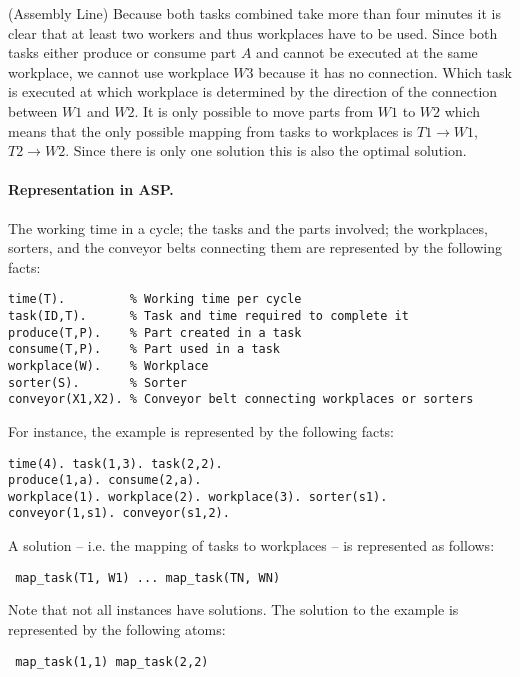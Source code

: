 \documentclass[a4paper,12pt]{article}
\begin{document}
\begin{PraktikumsAufgabe}{2}{(Assembly Line)}
Because both tasks combined take more than four minutes it is clear that at least two workers and thus workplaces have to be used.
Since both tasks either produce or consume part $A$ and cannot be executed at the same workplace,
we cannot use workplace $W3$ because it has no connection.
Which task is executed at which workplace is determined by the direction of the connection between $W1$ and $W2$.
It is only possible to move parts from $W1$ to $W2$ which means that the only possible mapping from tasks to workplaces is
$T1 \rightarrow W1$, $T2 \rightarrow W2$. Since there is only one solution this is also the optimal solution.

\paragraph{Representation in ASP.}
The working time in a cycle;
the tasks and the parts involved;
the workplaces, sorters, and the conveyor belts connecting them
are represented by the following facts:

\vspace{-1.5mm}
\begin{verbatim}
time(T).         % Working time per cycle
task(ID,T).      % Task and time required to complete it
produce(T,P).    % Part created in a task
consume(T,P).    % Part used in a task
workplace(W).    % Workplace
sorter(S).       % Sorter
conveyor(X1,X2). % Conveyor belt connecting workplaces or sorters
\end{verbatim}
\vspace{-1mm}
For instance, the example
is represented by the following facts:%
\vspace{-1.5mm}
\begin{verbatim}
time(4). task(1,3). task(2,2).
produce(1,a). consume(2,a).
workplace(1). workplace(2). workplace(3). sorter(s1).
conveyor(1,s1). conveyor(s1,2).
\end{verbatim}
\vspace{-1mm}
A solution -- i.e. the mapping of tasks to workplaces -- is represented as follows:
\vspace{-1.5mm}
\begin{verbatim}
 map_task(T1, W1) ... map_task(TN, WN)
\end{verbatim}
\vspace{-1mm}
Note that not all instances have solutions.
The solution to the example is represented by the following atoms:
\vspace{-1.5mm}
\begin{verbatim}
 map_task(1,1) map_task(2,2)
\end{verbatim}
\vspace{-1mm}


\end{PraktikumsAufgabe}
\end{document}

